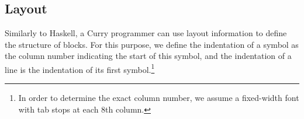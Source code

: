 \begin{grammar}
\\
\\
\\
\\
\\
\\
\\
 \\
\end{grammar}

\subsection{Layout}
Similarly to Haskell, a Curry programmer can use layout
information to define the structure of blocks.
For this purpose, we define
the indentation of a symbol as the column number indicating
the start of this symbol, and
the indentation of a line is the
indentation of its first symbol.\footnote{In order to determine
the exact column number, we assume a fixed-width font with
tab stops at each 8th column.}

